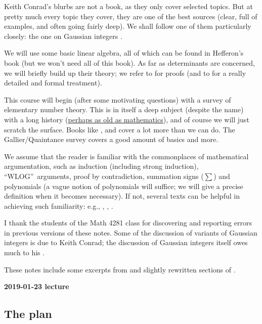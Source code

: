 \documentclass[numbers=enddot,12pt,final,onecolumn,notitlepage]{scrartcl}%
\numberwithin{exer}{subsection}
\theoremstyle{definition}
\let\sumnonlimits\sum
\renewcommand{\sum}{\sumnonlimits\limits}
\begin{document}
Keith Conrad's blurbs \cite{Conrad*} are not a book, as they only cover
selected topics. But at pretty much every topic they cover, they are one of
the best sources (clear, full of examples, and often going fairly deep). We
shall follow one of them particularly closely: the one on Gaussian integers
\cite{Conrad-Gauss}.

We will use some basic linear algebra, all of which can be found in Hefferon's
book \cite{Hefferon} (but we won't need all of this book). As far as
determinants are concerned, we will briefly build up their theory; we refer to
\cite[Section 12 \& Appendix B]{Strickland} for proofs (and to \cite[Chapter
6]{detnotes} for a really detailed and formal treatment).

This course will begin (after some motivating questions) with a survey of
elementary number theory. This is in itself a deep subject (despite the name)
with a long history (\href{https://en.wikipedia.org/wiki/Plimpton_322}{perhaps
as old as mathematics}), and of course we will just scratch the surface. Books
like \cite{NiZuMo91}, \cite{Burton} and \cite{Uspensky-Heaslet} cover a lot
more than we can do. The Gallier/Quaintance survey \cite{Gallier-RSA} covers a
good amount of basics and more.

We assume that the reader is familiar with the commonplaces of mathematical
argumentation, such as induction (including strong induction),
\textquotedblleft WLOG\textquotedblright\ arguments, proof by contradiction,
summation signs ($\sum$) and polynomials (a vague notion of polynomials will
suffice; we will give a precise definition when it becomes necessary). If not,
several texts can be helpful in achieving such familiarity: e.g.,
\cite[particularly Chapters 1--5]{LeLeMe}, \cite{Hammack}, \cite{Day}.

I thank the students of the Math 4281 class for discovering and reporting
errors in previous versions of these notes. Some of the discussion of variants
of Gaussian integers is due to Keith Conrad; the discussion of Gaussian
integers itself owes much to his \cite{Conrad-Gauss}.

These notes include some excerpts from \cite{floor} and slightly rewritten
sections of \cite{detnotes}.

\begin{center}
\textbf{2019-01-23 lecture}
\end{center}

\subsection{The plan}
\end{document}

